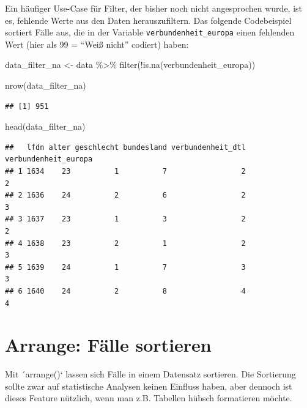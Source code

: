 \documentclass[
]{book}
\newenvironment{Shaded}{\begin{snugshade}}{\end{snugshade}}
\newcommand{\FunctionTok}[1]{\textcolor[rgb]{0.00,0.00,0.00}{#1}}
\newcommand{\NormalTok}[1]{#1}
\newcommand{\OtherTok}[1]{\textcolor[rgb]{0.56,0.35,0.01}{#1}}
\newcommand{\SpecialCharTok}[1]{\textcolor[rgb]{0.00,0.00,0.00}{#1}}
\begin{document}
Ein häufiger Use-Case für Filter, der bisher noch nicht angesprochen wurde, ist es, fehlende Werte aus den Daten herauszufiltern. Das folgende Codebeispiel sortiert Fälle aus, die in der Variable \texttt{verbundenheit\_europa} einen fehlenden Wert (hier als 99 = ``Weiß nicht'' codiert) haben:

\begin{Shaded}
\begin{Highlighting}[]
\NormalTok{data\_filter\_na }\OtherTok{\textless{}{-}}\NormalTok{ data }\SpecialCharTok{\%\textgreater{}\%} 
  \FunctionTok{filter}\NormalTok{(}\SpecialCharTok{!}\FunctionTok{is.na}\NormalTok{(verbundenheit\_europa))}

\FunctionTok{nrow}\NormalTok{(data\_filter\_na)}
\end{Highlighting}
\end{Shaded}

\begin{verbatim}
## [1] 951
\end{verbatim}

\begin{Shaded}
\begin{Highlighting}[]
\FunctionTok{head}\NormalTok{(data\_filter\_na)}
\end{Highlighting}
\end{Shaded}

\begin{verbatim}
##   lfdn alter geschlecht bundesland verbundenheit_dtl verbundenheit_europa
## 1 1634    23          1          7                 2                    2
## 2 1636    24          2          6                 2                    3
## 3 1637    23          1          3                 2                    2
## 4 1638    23          2          1                 2                    3
## 5 1639    24          1          7                 3                    3
## 6 1640    24          2          8                 4                    4
\end{verbatim}

\hypertarget{arrange-fuxe4lle-sortieren}{%
\section{Arrange: Fälle sortieren}\label{arrange-fuxe4lle-sortieren}}

Mit ´arrange()` lassen sich Fälle in einem Datensatz sortieren. Die Sortierung sollte zwar auf statistische Analysen keinen Einfluss haben, aber dennoch ist dieses Feature nützlich, wenn man z.B. Tabellen hübsch formatieren möchte.
\end{document}
